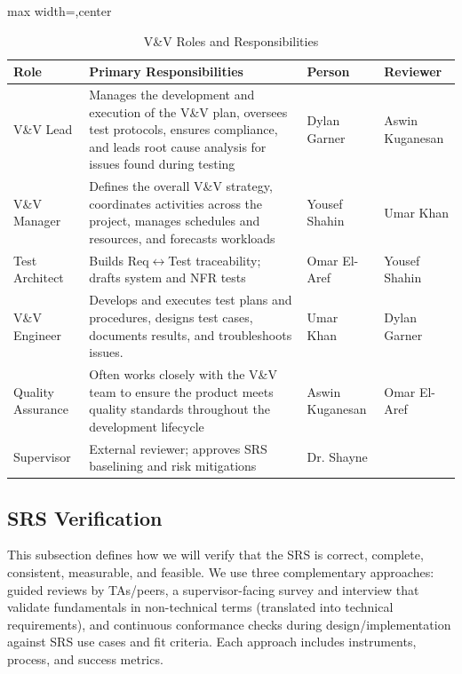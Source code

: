 \documentclass[12pt, titlepage]{article}
\begin{document}
\begin{table}[h]
\centering
\caption{V\&V Roles and Responsibilities}
\begin{adjustbox}{max width=\textwidth,center}
\begin{tabular}{p{3.2cm} p{7.2cm} p{3cm} p{2cm}}
\toprule
\textbf{Role} & \textbf{Primary Responsibilities} & \textbf{Person} & \textbf{Reviewer}\\
\midrule
V\&V Lead & Manages the development and execution of the V\&V plan, oversees test protocols, ensures compliance, and leads root cause analysis for issues found during testing  & Dylan Garner & Aswin Kuganesan\\
V\&V Manager & Defines the overall V\&V strategy, coordinates activities across the project, manages schedules and resources, and forecasts workloads & Yousef Shahin & Umar Khan \\
Test Architect & Builds Req$\leftrightarrow$Test traceability; drafts system and NFR tests & Omar El-Aref & Yousef Shahin \\
V\&V Engineer &  Develops and executes test plans and procedures, designs test cases, documents results, and troubleshoots issues.  & Umar Khan & Dylan Garner \\
Quality Assurance & Often works closely with the V\&V team to ensure the product meets quality standards throughout the development lifecycle & Aswin Kuganesan & Omar El-Aref\\
Supervisor &  External reviewer; approves SRS baselining and risk mitigations & Dr. Shayne & \\
\bottomrule
\end{tabular}
\end{adjustbox}
\end{table}

\subsection{SRS Verification}

This subsection defines how we will verify that the SRS \citep{SRS-Sanskrit-Ciphers} is correct, complete, consistent, measurable, and feasible. We use three complementary approaches: guided reviews by TAs/peers, a supervisor-facing survey and interview that validate fundamentals in non-technical terms (translated into technical requirements), and continuous conformance checks during design/implementation against SRS use cases and fit criteria. Each approach includes instruments, process, and success metrics.
\end{document}
